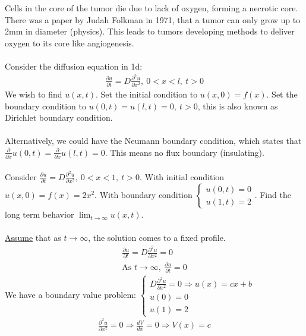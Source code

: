\documentclass[12pt, letterpaper]{article}
\begin{document}
Cells in the core of the tumor die due to lack of oxygen, forming a necrotic core. There was a 
paper by Judah Folkman in 1971, that a tumor can only grow up to 2mm in diameter (physics). This 
leads to tumors developing methods to deliver oxygen to its core like angiogenesis. \\ \\
Consider the diffusion equation in 1d:
\begin{align*}
    \frac{\partial u}{\partial t} = D \frac{\partial^2 u}{\partial x^2},\ 0 < x < l,\ t > 0
\end{align*}
We wish to find $u(x,t)$. Set the initial condition to $u(x,0) = f(x)$. Set the boundary condition
to $u(0,t) = u(l,t) = 0,\ t>0$, this is also known as Dirichlet boundary condition. \\ \\
Alternatively, we could have the Neumann boundary condition, which states that 
$\frac{\partial }{\partial x}u(0,t) = \frac{\partial }{\partial x}u(l,t) = 0$. This means no
flux boundary (insulating). \\ \\ 
 Consider $\frac{\partial u }{\partial t} = D \frac{\partial^2 u}{\partial x^2},\ 
0 < x < 1,\ t > 0$. With initial condition $u(x,0) = f(x) = 2x^2$. With boundary condition 
$\begin{cases}
    u(0,t) = 0 \\
    u(1,t) = 2
\end{cases}$. Find the long term behavior $\lim_{t\rightarrow\infty} u(x,t)$. \\ \\ 
\underline{Assume} that as $t \rightarrow \infty$, the solution comes to a fixed profile. 
\begin{align*}
    \frac{\partial u}{\partial t} = D \frac{\partial^2 u}{\partial x^2} = 0 \\
    \text{As } t \rightarrow \infty,\ \frac{\partial u}{\partial t} = 0
\end{align*}
We have a boundary value problem: $\begin{cases}
    D \frac{\partial^2 u }{\partial x^2} = 0 \Rightarrow u(x) = cx + b\\
    u(0) = 0 \\
    u(1) = 2
    \end{cases}$
\begin{align*}
    \frac{\partial^2 u}{\partial x^2} = 0 \Rightarrow \frac{dV}{dx} = 0 \Rightarrow V(x) = c
\end{align*}
\end{document}
